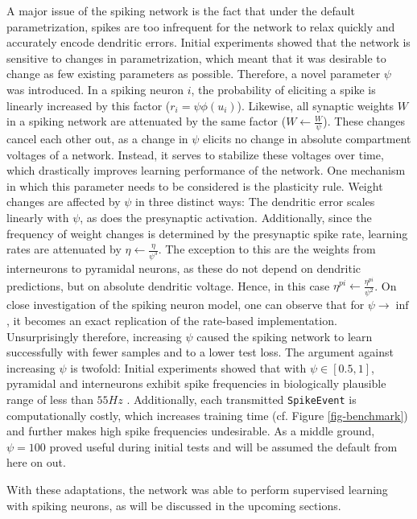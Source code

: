 A major issue of the spiking network is the fact that under the default parametrization, spikes are too infrequent for
the network to relax quickly and accurately encode dendritic errors. Initial experiments showed that the network is
sensitive to changes in parametrization, which meant that it was desirable to change as few existing parameters as
possible. Therefore, a novel parameter $\psi$ was introduced. In a spiking neuron $i$, the probability of eliciting a
spike is linearly increased by this factor ($r_i = \psi \phi(u_i)$). Likewise, all synaptic weights $W$ in a spiking
network are attenuated by the same factor ($W \leftarrow \frac{W}{\psi}$). These changes cancel each other out, as a
change in $\psi$ elicits no change in absolute compartment voltages of a network. Instead, it serves to stabilize these
voltages over time, which drastically improves learning performance of the network. One mechanism in which this
parameter needs to be considered is the plasticity rule. Weight changes are affected by $\psi$ in three distinct ways:
The dendritic error scales linearly with $\psi$, as does the presynaptic activation. Additionally, since the frequency
of weight changes is determined by the presynaptic spike rate, learning rates are attenuated by $\eta \leftarrow
\frac{\eta}{\psi^3}$. The exception to this are the weights from interneurons to pyramidal neurons, as these do not
depend on dendritic predictions, but on absolute dendritic voltage. Hence, in this case $\eta^{pi}
\leftarrow\frac{\eta^{pi}}{\psi^2}$. On close investigation of the spiking neuron model, one can observe that for $\psi
\rightarrow \inf$, it becomes an exact replication of the rate-based implementation. Unsurprisingly therefore,
increasing $\psi$ caused the spiking network to learn successfully with fewer samples and to a lower test loss. The
argument against increasing $\psi$ is twofold: Initial experiments showed that with $\psi \in [0.5, 1]$, pyramidal and
interneurons exhibit spike frequencies in biologically plausible range of less than $55Hz$
\cite{Kawaguchi2001,Eyal2018}. Additionally, each transmitted \texttt{SpikeEvent} is computationally costly, which
increases training time (cf. Figure \ref{fig-benchmark}) and further makes high spike frequencies undesirable. As a
middle ground, $\psi = 100$ proved useful during initial tests and will be assumed the default from here on out.

With these adaptations, the network was able to perform supervised learning with spiking neurons, as will be discussed
in the upcoming sections.

